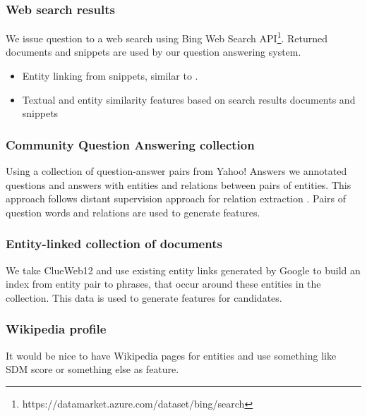 \subsubsection{Web search results}
We issue question to a web search using Bing Web Search API\footnote{https://datamarket.azure.com/dataset/bing/search}.
Returned documents and snippets are used by our question answering system.

\begin{itemize}
\item Entity linking from snippets, similar to \cite{SMAPH_ERD:2014}.
\item Textual and entity similarity features based on search results documents and snippets
\end{itemize}

\subsubsection{Community Question Answering collection}
Using a collection of question-answer pairs from Yahoo! Answers we annotated questions and answers with entities and relations between pairs of entities.
This approach follows distant supervision approach for relation extraction \cite{savenkov-EtAl:2015:SRW}.
Pairs of question words and relations are used to generate features.

\subsubsection{Entity-linked collection of documents}
We take ClueWeb12 and use existing entity links generated by Google to build an index from entity pair to phrases, that occur around these entities in the collection.
This data is used to generate features for candidates.

\subsubsection{Wikipedia profile}
It would be nice to have Wikipedia pages for entities and use something like SDM score or something else as feature.